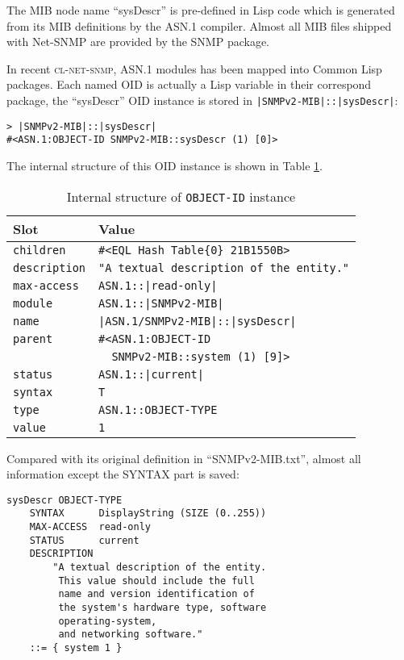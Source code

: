 \documentclass[reprint,9pt]{sigplanconf}
\begin{document}
The MIB node name ``sysDescr'' is pre-defined in Lisp code which is
generated from its MIB definitions by the ASN.1 compiler. Almost all MIB
files shipped with Net-SNMP are provided by the SNMP package.

In recent \textsc{cl-net-snmp}, ASN.1 modules has been mapped
into Common Lisp packages. Each named OID is actually a Lisp variable
in their correspond package, the ``sysDescr'' OID instance is stored
in \texttt{|SNMPv2-MIB|::|sysDescr|}:
\begin{verbatim}
> |SNMPv2-MIB|::|sysDescr|
#<ASN.1:OBJECT-ID SNMPv2-MIB::sysDescr (1) [0]>
\end{verbatim}
The internal structure of this OID instance is shown in Table
\ref{table:object-id}.

\begin{table}
  \centering
  \caption{Internal structure of \texttt{OBJECT-ID} instance}
  \label{table:object-id}
  \begin{tabular}{|l|l|}
    \hline
    \textbf{Slot} & \textbf{Value}\\
    \hline
    \texttt{children} & \texttt{\#<EQL Hash Table\{0\} 21B1550B>}\\
    \texttt{description} & \texttt{"A textual description of the entity."}\\
    \texttt{max-access} & \texttt{ASN.1::|read-only|}\\
    \texttt{module} & \texttt{ASN.1::|SNMPv2-MIB|}\\
    \texttt{name} & \texttt{|ASN.1/SNMPv2-MIB|::|sysDescr|}\\
    \texttt{parent} & \texttt{\#<ASN.1:OBJECT-ID}\\
    & \texttt{\ \ SNMPv2-MIB::system (1) [9]>}\\
    \texttt{status} & \texttt{ASN.1::|current|}\\
    \texttt{syntax} & \texttt{T}\\
    \texttt{type} & \texttt{ASN.1::OBJECT-TYPE}\\
    \texttt{value} & \texttt{1}\\
    \hline
  \end{tabular}
\end{table}

Compared with its original definition in ``SNMPv2-MIB.txt'', almost
all information except the SYNTAX part is saved:

\begin{verbatim}
sysDescr OBJECT-TYPE
    SYNTAX      DisplayString (SIZE (0..255))
    MAX-ACCESS  read-only
    STATUS      current
    DESCRIPTION
        "A textual description of the entity.
         This value should include the full
         name and version identification of
         the system's hardware type, software
         operating-system,
         and networking software."
    ::= { system 1 }
\end{verbatim}
\end{document}
